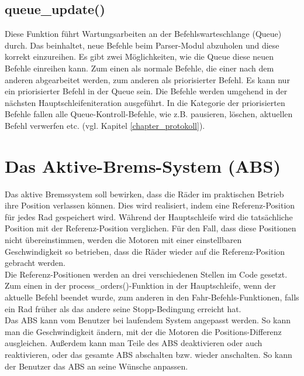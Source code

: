 \subsection{queue\_update()\label{chapter_queue_update}}
Diese Funktion führt Wartungsarbeiten an der Befehlswarteschlange (Queue) durch. Das beinhaltet, neue
Befehle beim Parser-Modul abzuholen und diese korrekt einzureihen. Es gibt zwei Möglichkeiten, wie die Queue
diese neuen Befehle einreihen kann. Zum einen als normale Befehle, die einer nach dem anderen abgearbeitet werden,
zum anderen als priorisierter Befehl. Es kann nur ein priorisierter Befehl in der Queue sein. Die Befehle werden
umgehend in der nächsten Haupt\-schleifen\-iteration ausgeführt. In die Kategorie der priorisierten Befehle fallen
alle Queue-Kontroll-Befehle, wie z.B. pausieren, löschen, aktuellen Befehl verwerfen etc. (vgl. Kapitel \ref{chapter_protokoll}).

\section{Das Aktive-Brems-System (ABS)\label{chapter_abs}}
Das aktive Bremssystem soll bewirken, dass die Räder im praktischen Betrieb ihre Position verlassen können.
Dies wird realisiert, indem
eine Referenz-Position für jedes Rad gespeichert wird. Während der Hauptschleife wird die tatsächliche Position mit
der Referenz-Position verglichen. Für den Fall, dass diese Positionen nicht übereinstimmen, werden die Motoren mit einer
einstellbaren Geschwindigkeit so betrieben, dass die Räder wieder auf die Referenz-Position gebracht werden.\\
Die Referenz-Positionen werden an drei verschiedenen Stellen im Code gesetzt. Zum einen in der process\_\-orders()-Funktion
in der Hauptschleife, wenn der aktuelle Befehl beendet wurde, zum anderen in den Fahr-Befehls-Funktionen, falls ein Rad
früher als das andere seine Stopp-Bedingung erreicht hat.\\
Das ABS kann vom Benutzer bei laufendem System angepasst werden. So kann man die Geschwindigkeit ändern, mit der
die Motoren die Positions-Differenz ausgleichen. Außerdem kann man Teile des ABS deaktivieren oder auch reaktivieren,
oder das gesamte ABS abschalten bzw. wieder anschalten. So kann der Benutzer das ABS an seine Wünsche anpassen.

